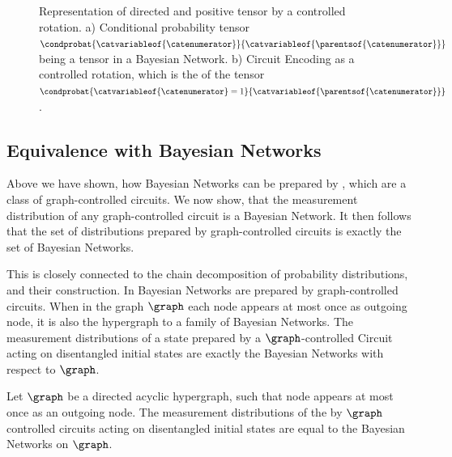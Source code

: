 \begin{figure}
    \begin{center}
        
    \end{center}
    \caption{
        Representation of directed and positive tensor by a controlled rotation.
        a) Conditional probability tensor $\condprobat{\catvariableof{\catenumerator}}{\catvariableof{\parentsof{\catenumerator}}}$ being a tensor in a Bayesian Network.
        b) Circuit Encoding as a controlled rotation, which is the \ActivationCircuit{} of the tensor $\condprobat{\catvariableof{\catenumerator}=1}{\catvariableof{\parentsof{\catenumerator}}}$.
    }\label{fig:cpdEncoding}
\end{figure}




\subsection{Equivalence with Bayesian Networks}

Above we have shown, how Bayesian Networks can be prepared by \activationCircuits{}, which are a class of graph-controlled circuits.
We now show, that the measurement distribution of any graph-controlled circuit is a Bayesian Network.
It then follows that the set of distributions prepared by graph-controlled circuits is exactly the set of Bayesian Networks.


This is closely connected to the chain decomposition of probability distributions, and their construction.
In \cite{low_quantum_2014} Bayesian Networks are prepared by graph-controlled circuits.
When in the graph $\graph$ each node appears at most once as outgoing node, it is also the hypergraph to a family of Bayesian Networks.
The measurement distributions of a state prepared by a $\graph$-controlled Circuit acting on disentangled initial states are exactly the Bayesian Networks with respect to $\graph$.

\begin{theorem}
    \label{the:graphControlledPreparesBN}
    Let $\graph$ be a directed acyclic hypergraph, such that node appears at most once as an outgoing node.
    The measurement distributions of the by $\graph$ controlled circuits acting on disentangled initial states are equal to the Bayesian Networks on $\graph$.
\end{theorem}


